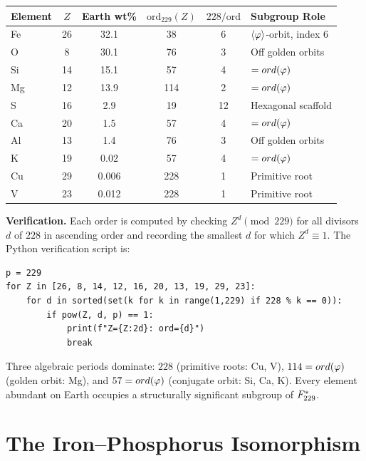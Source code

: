 \begin{center}
\begin{tabular}{@{}lccccl@{}}
\toprule
\textbf{Element} & $Z$ & \textbf{Earth wt\%} & $\mathrm{ord}_{229}(Z)$ & $228 / \mathrm{ord}$ & \textbf{Subgroup Role} \\
\midrule
Fe & 26 & 32.1 & 38  & 6  & $\langle\varphi\rangle$-orbit, index 6 \\
O  & 8  & 30.1 & 76  & 3  & Off golden orbits \\
Si & 14 & 15.1 & 57  & 4  & $= ord(\varphi)$ \\
Mg & 12 & 13.9 & 114 & 2  & $= ord(\varphi)$ \\
S  & 16 & 2.9  & 19  & 12 & Hexagonal scaffold \\
Ca & 20 & 1.5  & 57  & 4  & $= ord(\varphi)$ \\
Al & 13 & 1.4  & 76  & 3  & Off golden orbits \\
K  & 19 & 0.02 & 57  & 4  & $= ord(\varphi)$ \\
Cu & 29 & 0.006 & 228 & 1 & Primitive root \\
V  & 23 & 0.012 & 228 & 1 & Primitive root \\
\bottomrule
\end{tabular}
\end{center}

\noindent\textbf{Verification.} Each order is computed by checking $Z^d \pmod{229}$ for all divisors $d$ of $228$ in ascending order and recording the smallest $d$ for which $Z^d \equiv 1$. The Python verification script is:

\begin{verbatim}
p = 229
for Z in [26, 8, 14, 12, 16, 20, 13, 19, 29, 23]:
    for d in sorted(set(k for k in range(1,229) if 228 % k == 0)):
        if pow(Z, d, p) == 1:
            print(f"Z={Z:2d}: ord={d}")
            break
\end{verbatim}

\noindent Three algebraic periods dominate: $228$ (primitive roots: Cu, V), $114 = ord(\varphi)$ (golden orbit: Mg), and $57 = ord(\varphi)$ (conjugate orbit: Si, Ca, K). Every element abundant on Earth occupies a structurally significant subgroup of $F_{229}^*$.

\section{The Iron--Phosphorus Isomorphism}\label{sec:fep}

